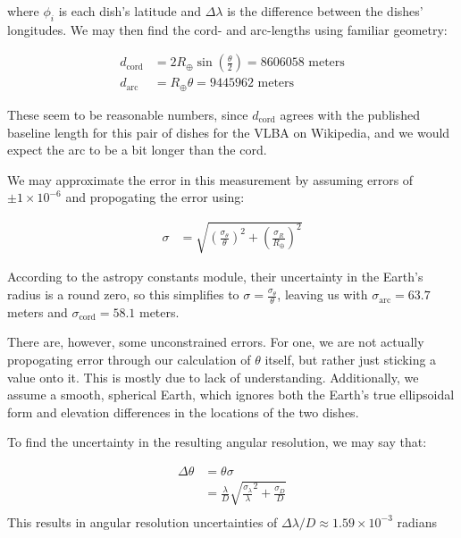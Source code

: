 \documentclass[12pt]{article}
\begin{document}
\begin{onehalfspacing}
where $\phi_i$ is each dish's latitude and $\Delta \lambda$ is the difference between the dishes' longitudes. We may then find the cord- and arc-lengths using familiar geometry:

\begin{align*}
  d_{\text{cord}} &= 2 R_{\oplus} \sin(\frac{\theta}{2}) = 8606058 \text{ meters}\\
  d_{\text{arc}} &= R_{\oplus} \theta = 9445962 \text{ meters}
\end{align*}
\bigskip

These seem to be reasonable numbers, since $d_{\text{cord}}$ agrees with the published baseline length for this pair of dishes for the VLBA on Wikipedia, and we would expect the arc to be a bit longer than the cord. \bigskip

We may approximate the error in this measurement by assuming errors of $\pm 1 \times 10^{-6}$ and propogating the error using:

\begin{align*}
  \sigma &= \sqrt{ \left(\frac{\sigma_{\theta}}{\theta}\right)^2 + \left(\frac{\sigma_{R}}{R_{\oplus}}\right)^2}
\end{align*}

According to the astropy constants module, their uncertainty in the Earth's radius is a round zero, so this simplifies to $\sigma = \frac{\sigma_{\theta}}{\theta}$, leaving us with $\sigma_{\text{arc}} = 63.7$ meters and $\sigma_{\text{cord}} = 58.1$ meters. \bigskip

There are, however, some unconstrained errors. For one, we are not actually propogating error through our calculation of $\theta$ itself, but rather just sticking a value onto it. This is mostly due to lack of understanding. Additionally, we assume a smooth, spherical Earth, which ignores both the Earth's true ellipsoidal form and elevation differences in the locations of the two dishes.\bigskip

To find the uncertainty in the resulting angular resolution, we may say that:

\begin{align*}
  \Delta \theta &= \theta \sigma \\
                &= \frac{\lambda}{D} \sqrt{\frac{\sigma_{\lambda}}{\lambda}^2 + \frac{\sigma_{D}}{D}} \\
\end{align*}
This results in angular resolution uncertainties of $\Delta \lambda/D \approx 1.59 \times 10^{-3}$ radians




\end{onehalfspacing}
\end{document}
